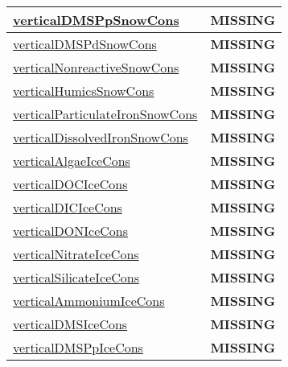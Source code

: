 {\begin{center}
\begin{longtable}{| p{2.0in} | p{4.0in} |}
    \hline
    \hyperref[subsec:var_sec_tracer_conservation_verticalDMSPpSnowCons]{verticalDMSPpSnowCons} & {\bf \color{red} MISSING} \\
    \hline
    \hyperref[subsec:var_sec_tracer_conservation_verticalDMSPdSnowCons]{verticalDMSPdSnowCons} & {\bf \color{red} MISSING} \\
    \hline
    \hyperref[subsec:var_sec_tracer_conservation_verticalNonreactiveSnowCons]{verticalNonreactiveSnowCons} & {\bf \color{red} MISSING} \\
    \hline
    \hyperref[subsec:var_sec_tracer_conservation_verticalHumicsSnowCons]{verticalHumicsSnowCons} & {\bf \color{red} MISSING} \\
    \hline
    \hyperref[subsec:var_sec_tracer_conservation_verticalParticulateIronSnowCons]{verticalParticulateIronSnowCons} & {\bf \color{red} MISSING} \\
    \hline
    \hyperref[subsec:var_sec_tracer_conservation_verticalDissolvedIronSnowCons]{verticalDissolvedIronSnowCons} & {\bf \color{red} MISSING} \\
    \hline
    \hyperref[subsec:var_sec_tracer_conservation_verticalAlgaeIceCons]{verticalAlgaeIceCons} & {\bf \color{red} MISSING} \\
    \hline
    \hyperref[subsec:var_sec_tracer_conservation_verticalDOCIceCons]{verticalDOCIceCons} & {\bf \color{red} MISSING} \\
    \hline
    \hyperref[subsec:var_sec_tracer_conservation_verticalDICIceCons]{verticalDICIceCons} & {\bf \color{red} MISSING} \\
    \hline
    \hyperref[subsec:var_sec_tracer_conservation_verticalDONIceCons]{verticalDONIceCons} & {\bf \color{red} MISSING} \\
    \hline
    \hyperref[subsec:var_sec_tracer_conservation_verticalNitrateIceCons]{verticalNitrateIceCons} & {\bf \color{red} MISSING} \\
    \hline
    \hyperref[subsec:var_sec_tracer_conservation_verticalSilicateIceCons]{verticalSilicateIceCons} & {\bf \color{red} MISSING} \\
    \hline
    \hyperref[subsec:var_sec_tracer_conservation_verticalAmmoniumIceCons]{verticalAmmoniumIceCons} & {\bf \color{red} MISSING} \\
    \hline
    \hyperref[subsec:var_sec_tracer_conservation_verticalDMSIceCons]{verticalDMSIceCons} & {\bf \color{red} MISSING} \\
    \hline
    \hyperref[subsec:var_sec_tracer_conservation_verticalDMSPpIceCons]{verticalDMSPpIceCons} & {\bf \color{red} MISSING} \\

\end{longtable}
\end{center}}
